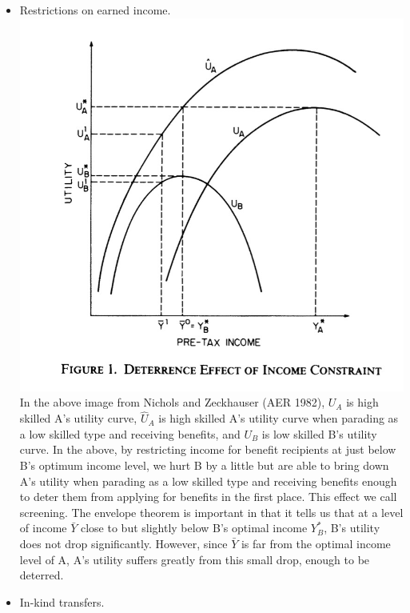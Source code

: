 \documentclass[
]{article}
\begin{document}
\begin{itemize}
\item
  Restrictions on earned income.\\
  \includegraphics{restrictions.jpg} In the above image from Nichols and
  Zeckhauser (AER 1982), \(U_A\) is high skilled A's utility curve,
  \(\hat{U}_A\) is high skilled A's utility curve when parading as a low
  skilled type and receiving benefits, and \(U_B\) is low skilled B's
  utility curve. In the above, by restricting income for benefit
  recipients at just below B's optimum income level, we hurt B by a
  little but are able to bring down A's utility when parading as a low
  skilled type and receiving benefits enough to deter them from applying
  for benefits in the first place. This effect we call screening. The
  envelope theorem is important in that it tells us that at a level of
  income \(\bar{Y}\) close to but slightly below B's optimal income
  \(Y_B ^*\), B's utility does not drop significantly. However, since
  \(\bar{Y}\) is far from the optimal income level of A, A's utility
  suffers greatly from this small drop, enough to be deterred.
\item
  In-kind transfers.\\

\end{itemize}
\end{document}

